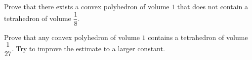 Prove that there exists a convex polyhedron of volume $1$ that does not contain a tetrahedron of volume $\dfrac{1}{8}$.

Prove that any convex polyhedron of volume $1$ contains a tetrahedron of volume $\dfrac{1}{27}$.
Try to improve the estimate to a larger constant.
